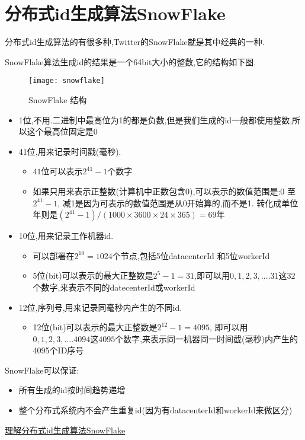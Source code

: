 \chapter{分布式id生成算法SnowFlake}
分布式id生成算法的有很多种,Twitter的SnowFlake就是其中经典的一种.

SnowFlake算法生成id的结果是一个64bit大小的整数,它的结构如下图.

\begin{figure}[htbp]
	\centering
	\texttt{[image: snowflake]}\\
	\caption{SnowFlake 结构}
	\label{fig.snowflake}
\end{figure}

\begin{itemize}
\item 1位,不用.二进制中最高位为1的都是负数,但是我们生成的id一般都使用整数,所以这个最高位固定是0
\item 41位,用来记录时间戳(毫秒).
	\begin{itemize}
	\item $41$位可以表示$2^{41} − 1$个数字
	\item 如果只用来表示正整数(计算机中正数包含0),可以表示的数值范围是:$0$ 至 $2^{41} − 1$, 减1是因为可表示的数值范围是从0开始算的,而不是1. 转化成单位年则是$(2^{41} − 1) / (1000 \times 3600 \times 24 \times 365) = 69$年
	\end{itemize}
\item 10位,用来记录工作机器id.
	\begin{itemize}
	\item 可以部署在$2^{10} = 1024$个节点,包括5位datacenterId 和5位workerId
	\item 5位(bit)可以表示的最大正整数是$2^5 − 1 = 31$,即可以用$0,1,2,3,....31$这$32$个数字,来表示不同的datecenterId或workerId
	\end{itemize}
\item 12位,序列号,用来记录同毫秒内产生的不同id.
	\begin{itemize}
	\item 12位(bit)可以表示的最大正整数是$2^{12} − 1 = 4095$, 即可以用$0,1,2,3,....4094$这$4095$个数字,来表示同一机器同一时间截(毫秒)内产生的4095个ID序号
	\end{itemize}
\end{itemize}

SnowFlake可以保证:
\begin{itemize}
\item 所有生成的id按时间趋势递增
\item 整个分布式系统内不会产生重复id(因为有datacenterId和workerId来做区分)
\end{itemize}

\href{https://segmentfault.com/a/1190000011282426}{理解分布式id生成算法SnowFlake}

